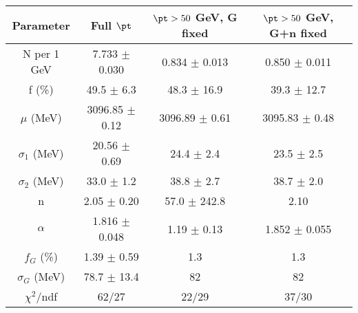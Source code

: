 \begin{tabular}{c||c|c|c}
Parameter & Full $\pt$ & $\pt>50$ GeV, G fixed & $\pt>50$ GeV, G+n fixed \\
\hline
N per 1 GeV & 7.733 $\pm$ 0.030 & 0.834 $\pm$ 0.013 & 0.850 $\pm$ 0.011\\
f (\%) & 49.5 $\pm$ 6.3 & 48.3 $\pm$ 16.9 & 39.3 $\pm$ 12.7\\
$\mu$ (MeV) & 3096.85 $\pm$ 0.12 & 3096.89 $\pm$ 0.61 & 3095.83 $\pm$ 0.48\\
$\sigma_1$ (MeV) & 20.56 $\pm$ 0.69 & 24.4 $\pm$ 2.4 & 23.5 $\pm$ 2.5\\
$\sigma_2$ (MeV) & 33.0 $\pm$ 1.2 & 38.8 $\pm$ 2.7 & 38.7 $\pm$ 2.0\\
n & 2.05 $\pm$ 0.20 & 57.0 $\pm$ 242.8 & 2.10\\
$\alpha$ & 1.816 $\pm$ 0.048 & 1.19 $\pm$ 0.13 & 1.852 $\pm$ 0.055\\
$f_G$ (\%) & 1.39 $\pm$ 0.59 & 1.3 & 1.3\\
$\sigma_G$ (MeV) & 78.7 $\pm$ 13.4 & 82 & 82\\
\hline
$\chi^2$/ndf & 62/27 & 22/29 & 37/30\\
\end{tabular}

